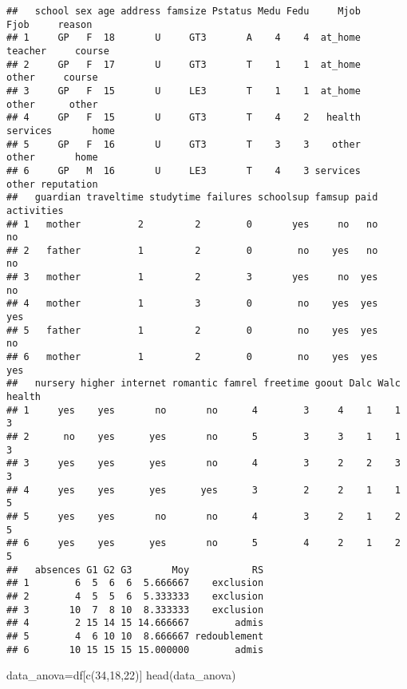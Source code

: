 \documentclass[
]{article}
\newenvironment{Shaded}{\begin{snugshade}}{\end{snugshade}}
\newcommand{\DecValTok}[1]{\textcolor[rgb]{0.00,0.00,0.81}{#1}}
\newcommand{\FunctionTok}[1]{\textcolor[rgb]{0.00,0.00,0.00}{#1}}
\newcommand{\NormalTok}[1]{#1}
\newcommand{\OtherTok}[1]{\textcolor[rgb]{0.56,0.35,0.01}{#1}}
\begin{document}
\begin{verbatim}
##   school sex age address famsize Pstatus Medu Fedu     Mjob     Fjob     reason
## 1     GP   F  18       U     GT3       A    4    4  at_home  teacher     course
## 2     GP   F  17       U     GT3       T    1    1  at_home    other     course
## 3     GP   F  15       U     LE3       T    1    1  at_home    other      other
## 4     GP   F  15       U     GT3       T    4    2   health services       home
## 5     GP   F  16       U     GT3       T    3    3    other    other       home
## 6     GP   M  16       U     LE3       T    4    3 services    other reputation
##   guardian traveltime studytime failures schoolsup famsup paid activities
## 1   mother          2         2        0       yes     no   no         no
## 2   father          1         2        0        no    yes   no         no
## 3   mother          1         2        3       yes     no  yes         no
## 4   mother          1         3        0        no    yes  yes        yes
## 5   father          1         2        0        no    yes  yes         no
## 6   mother          1         2        0        no    yes  yes        yes
##   nursery higher internet romantic famrel freetime goout Dalc Walc health
## 1     yes    yes       no       no      4        3     4    1    1      3
## 2      no    yes      yes       no      5        3     3    1    1      3
## 3     yes    yes      yes       no      4        3     2    2    3      3
## 4     yes    yes      yes      yes      3        2     2    1    1      5
## 5     yes    yes       no       no      4        3     2    1    2      5
## 6     yes    yes      yes       no      5        4     2    1    2      5
##   absences G1 G2 G3       Moy           RS
## 1        6  5  6  6  5.666667    exclusion
## 2        4  5  5  6  5.333333    exclusion
## 3       10  7  8 10  8.333333    exclusion
## 4        2 15 14 15 14.666667        admis
## 5        4  6 10 10  8.666667 redoublement
## 6       10 15 15 15 15.000000        admis
\end{verbatim}

\begin{Shaded}
\begin{Highlighting}[]
\NormalTok{data\_anova}\OtherTok{=}\NormalTok{df[}\FunctionTok{c}\NormalTok{(}\DecValTok{34}\NormalTok{,}\DecValTok{18}\NormalTok{,}\DecValTok{22}\NormalTok{)]}
\FunctionTok{head}\NormalTok{(data\_anova)}
\end{Highlighting}
\end{Shaded}
\end{document}
